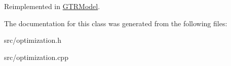 Reimplemented in \hyperlink{classGTRModel_ac32444cf94b5c3f3240aa344d4bc40b1}{GTRModel}.

The documentation for this class was generated from the following files:\begin{DoxyCompactItemize}
\item 
src/optimization.h\item 
src/optimization.cpp\end{DoxyCompactItemize}
